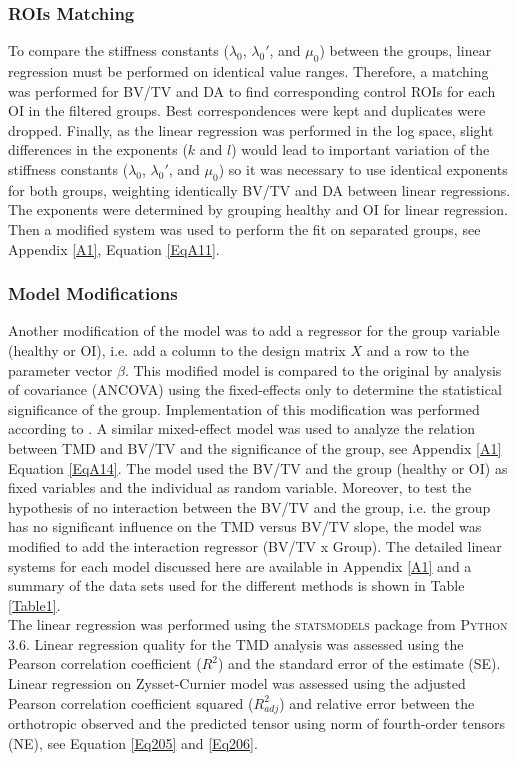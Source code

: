 \documentclass[a4paper,fleqn]{DC_ArtStyle}
\begin{document}
\subsubsection{ROIs Matching}
To compare the stiffness constants ($\lambda_0$, $\lambda_0'$, and $\mu_0$) between the groups, linear regression must be performed on identical value ranges. Therefore, a matching was performed for BV/TV and DA to find corresponding control ROIs for each OI in the filtered groups. Best correspondences were kept and duplicates were dropped. Finally, as the linear regression was performed in the log space, slight differences in the exponents ($k$ and $l$) would lead to important variation of the stiffness constants ($\lambda_0$, $\lambda_0'$, and $\mu_0$) so it was necessary to use identical exponents  for both groups, weighting identically BV/TV and DA between linear regressions. The exponents were determined by grouping healthy and OI for linear regression. Then a modified system was used to perform the fit on separated groups, see Appendix \ref{A1}, Equation \ref{EqA11}.\\

\subsubsection{Model Modifications}
Another modification of the model was to add a regressor for the group variable (healthy or OI), i.e. add a column to the design matrix $X$ and a row to the parameter vector $\beta$. This modified model is compared to the original by analysis of covariance (ANCOVA) using the fixed-effects only to determine the statistical significance of the group. Implementation of this modification was performed according to \cite{Fox2016}. A similar mixed-effect model was used to analyze the relation between TMD and BV/TV and the significance of the group, see Appendix \ref{A1} Equation \ref{EqA14}. The model used the BV/TV and the group (healthy or OI) as fixed variables and the individual as random variable. Moreover, to test the hypothesis of no interaction between the BV/TV and the group, i.e. the group has no significant influence on the TMD versus BV/TV slope, the model was modified to add the interaction regressor (BV/TV x Group). The detailed linear systems for each model discussed here are available in Appendix \ref{A1} and a summary of the data sets used for the different methods is shown in Table \ref{Table1}.\\

The linear regression was performed using the \textsc{statsmodels} package from \textsc{Python 3.6}. Linear regression quality for the TMD analysis was assessed using the Pearson correlation coefficient ($R^2$) and the standard error of the estimate (SE). Linear regression on Zysset-Curnier model was assessed using the adjusted Pearson correlation coefficient squared ($R^2_{adj}$) and relative error between the orthotropic observed and the predicted tensor using norm of fourth-order tensors (NE), see Equation \ref{Eq205} and \ref{Eq206}. 
\end{document}
